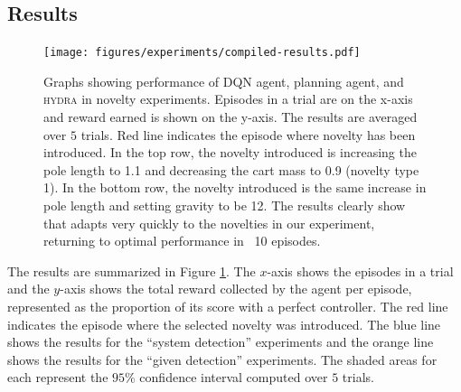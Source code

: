 \documentclass{article}
\begin{document}



\subsection{Results}

\begin{figure}
    \centering
    \texttt{[image: figures/experiments/compiled-results.pdf]}

    \caption{Graphs showing performance of DQN agent, planning agent, and \textsc{hydra} in novelty experiments. Episodes in a trial are on the x-axis and reward earned is shown on the y-axis. The results are averaged over $5$ trials. Red line indicates the episode where novelty has been introduced. In the top row, the novelty introduced is increasing the pole length to 1.1 and decreasing the cart mass to 0.9 (novelty type 1). In the bottom row, the novelty introduced is the same increase in pole length and setting gravity to be 12. The results clearly show that \hydra adapts very quickly to the novelties in our experiment, returning to optimal performance in ~10 episodes.}
    \label{fig:combined-results}
\end{figure}


The results are summarized in Figure \ref{fig:combined-results}. The $x$-axis shows the episodes in a trial and the $y$-axis shows the total reward collected by the agent per episode, represented as the proportion of its score with a perfect controller. 
The red line indicates the episode where the selected novelty was introduced. 
The blue line shows the results for the ``system detection'' experiments and the orange line shows the results for the ``given detection'' experiments. The shaded areas for each represent the $95\%$ confidence interval computed over $5$ trials.
\end{document}
